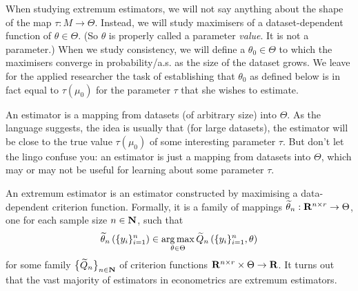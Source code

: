 \documentclass[11pt,letterpaper,reqno,oneside]{article}
\begin{document}
When studying extremum estimators, we will not say anything about the shape of the map $\tau : M \to \Theta$. Instead, we will study maximisers of a dataset-dependent function of $\theta \in \Theta$. (So $\theta$ is properly called a parameter \emph{value}. It is not a parameter.) When we study consistency, we will define a $\theta_0 \in \Theta$ to which the maximisers converge in probability/a.s. as the size of the dataset grows. We leave for the applied researcher the task of establishing that $\theta_0$ as defined below is in fact equal to $\tau(\mu_0)$ for the parameter $\tau$ that she wishes to estimate.

An estimator is a mapping from datasets (of arbitrary size) into $\Theta$. As the language suggests, the idea is usually that (for large datasets), the estimator will be close to the true value $\tau(\mu_0)$ of some interesting parameter $\tau$. But don't let the lingo confuse you: an estimator is just a mapping from datasets into $\Theta$, which may or may not be useful for learning about some parameter $\tau$.

An extremum estimator is an estimator constructed by maximising a data-dependent criterion function. Formally, it is a family of mappings $\widetilde{\theta}_n : \mathbf{R}^{n \times r} \to \Theta$, one for each sample size $n \in \mathbf{N}$, such that
%
\begin{equation*}
	\widetilde{\theta}_n\left( \{y_i\}_{i=1}^n \right) 
	\in \operatorname*{arg\,max}_{\theta\in\Theta} \widetilde{Q}_n\left( \{y_i\}_{i=1}^n , \theta \right)
\end{equation*}
%
for some family $\bigl\{ \widetilde{Q}_n \bigr\}_{n \in \mathbf{N}}$ of criterion functions $\mathbf{R}^{n \times r} \times \Theta \to \mathbf{R}$. It turns out that the vast majority of estimators in econometrics are extremum estimators.
\end{document}
